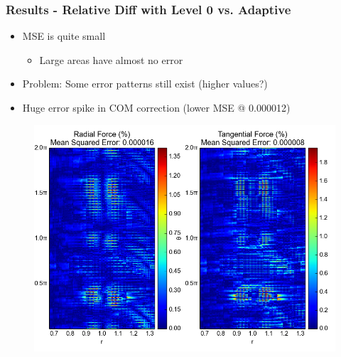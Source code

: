 \documentclass{beamer}
\begin{document}
\begin{frame}
 \frametitle{Results - Relative Diff with Level 0 vs. Adaptive}
\begin{itemize}
  \item MSE is quite small
  \begin{itemize}
    \item Large areas have almost no error
  \end{itemize}
  \item Problem: Some error patterns still exist (higher values?)
  \item Huge error spike in COM correction (lower MSE @ 0.000012)
 \end{itemize}

 \begin{figure}[H]
  \centering
  \includegraphics[width=.7\textwidth]{../../../Sara/run/default/diff_2D-euclid.png} 

\end{figure}
\end{frame}
\end{document}
